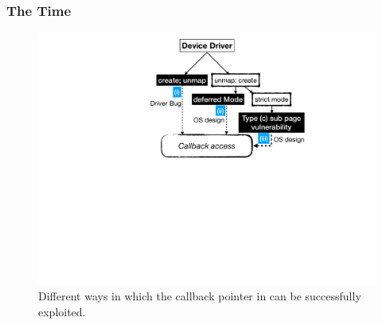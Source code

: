 \subsubsection{The Time \DIFdelbegin {}\DIFdelend \DIFaddbegin {}\DIFaddend }\label{sec:shinfo}

\begin{figure}[t]
    \centering
    \includegraphics[width=0.75\linewidth]{figs/road_to_op.pdf}
    \caption{Different ways in which the callback pointer in \shinfo can be successfully exploited.}
    \label{fig:road_to_op}
\end{figure}


